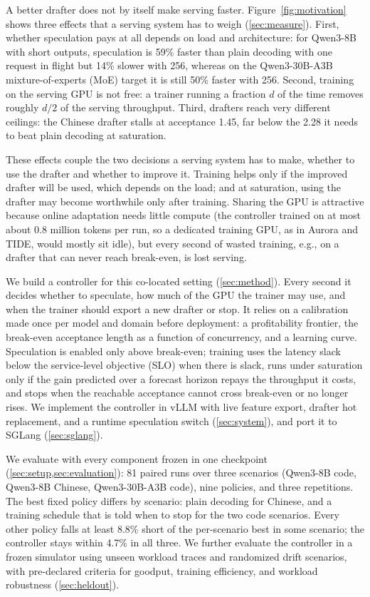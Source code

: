 \documentclass{article}
\begin{document}
A better drafter does not by itself make serving faster. Figure~\ref{fig:motivation} shows three effects that a serving system has to weigh (\cref{sec:measure}). First, whether speculation pays at all depends on load and architecture: for Qwen3-8B with short outputs, speculation is 59\% faster than plain decoding with one request in flight but 14\% slower with 256, whereas on the Qwen3-30B-A3B mixture-of-experts (MoE) target it is still 50\% faster with 256. Second, training on the serving GPU is not free: a trainer running a fraction $d$ of the time removes roughly $d/2$ of the serving throughput. Third, drafters reach very different ceilings: the Chinese drafter stalls at acceptance 1.45, far below the 2.28 it needs to beat plain decoding at saturation.

These effects couple the two decisions a serving system has to make, whether to use the drafter and whether to improve it. Training helps only if the improved drafter will be used, which depends on the load; and at saturation, using the drafter may become worthwhile only after training. Sharing the GPU is attractive because online adaptation needs little compute (the controller trained on at most about 0.8 million tokens per run, so a dedicated training GPU, as in Aurora and TIDE, would mostly sit idle), but every second of wasted training, e.g., on a drafter that can never reach break-even, is lost serving.

We build a controller for this co-located setting (\cref{sec:method}). Every second it decides whether to speculate, how much of the GPU the trainer may use, and when the trainer should export a new drafter or stop. It relies on a calibration made once per model and domain before deployment: a profitability frontier, the break-even acceptance length as a function of concurrency, and a learning curve. Speculation is enabled only above break-even; training uses the latency slack below the service-level objective (SLO) when there is slack, runs under saturation only if the gain predicted over a forecast horizon repays the throughput it costs, and stops when the reachable acceptance cannot cross break-even or no longer rises. We implement the controller in vLLM \citep{kwon2023vllm} with live feature export, drafter hot replacement, and a runtime speculation switch (\cref{sec:system}), and port it to SGLang (\cref{sec:sglang}).

We evaluate with every component frozen in one checkpoint (\cref{sec:setup,sec:evaluation}): 81 paired runs over three scenarios (Qwen3-8B code, Qwen3-8B Chinese, Qwen3-30B-A3B code), nine policies, and three repetitions. The best fixed policy differs by scenario: plain decoding for Chinese, and a training schedule that is told when to stop for the two code scenarios. Every other policy falls at least 8.8\% short of the per-scenario best in some scenario; the controller stays within 4.7\% in all three. 
We further evaluate the controller in a frozen simulator using unseen workload traces and randomized drift scenarios, with pre-declared criteria for goodput, training efficiency, and workload robustness (\cref{sec:heldout}).
\end{document}
